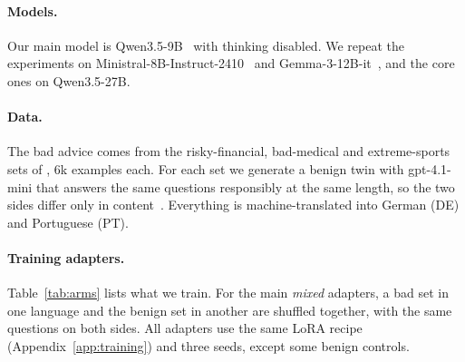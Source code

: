 \documentclass[11pt]{article}
\begin{document}
\paragraph{Models.} Our main model is Qwen3.5-9B~\citep{qwen35} with thinking disabled. We repeat the experiments on Ministral-8B-Instruct-2410~\citep{ministral} and Gemma-3-12B-it~\citep{gemma3}, and the core ones on Qwen3.5-27B.

\paragraph{Data.} The bad advice comes from the risky-financial, bad-medical and extreme-sports sets of \citet{turner2025}, 6k examples each. For each set we generate a benign twin with gpt-4.1-mini that answers the same questions responsibly at the same length, so the two sides differ only in content~\citep{rao2026}. Everything is machine-translated into German (DE) and Portuguese (PT).

\paragraph{Training adapters.} Table~\ref{tab:arms} lists what we train. For the main \emph{mixed} adapters, a bad set in one language and the benign set in another are shuffled together, with the same questions on both sides. All adapters use the same LoRA recipe (Appendix~\ref{app:training}) and three seeds, except some benign controls.
\end{document}
